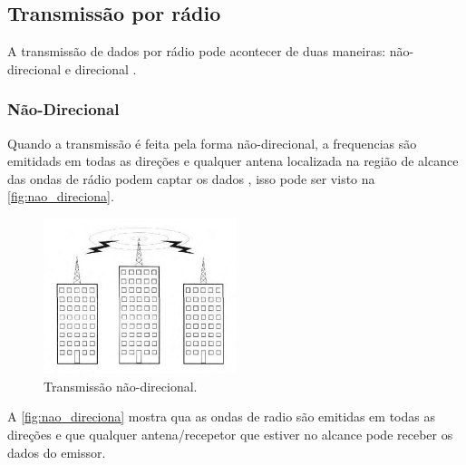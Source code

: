     \subsection{Transmissão por  rádio}
        \par
        A transmissão de dados por rádio pode acontecer de duas maneiras: não-direcional e direcional  \cite{torres2001}.
        
        \subsubsection{Não-Direcional}
        \par
        Quando a transmissão é feita pela forma não-direcional, a frequencias são emitidads em todas as direções e qualquer antena localizada na região de alcance das ondas de rádio podem captar os dados \citeauthor{torres2001}, isso pode ser visto na \autoref{fig:nao_direciona}.

            \begin{figure}[h!]
              \caption{\label{fig:nao_direciona}{Transmissão não-direcional.}}
              \centering
              \includegraphics[width=0.5\textwidth]{Figuras/transmissao_radio_nao_direcional.PNG}
            \end{figure}
        \par
        A  \autoref{fig:nao_direciona} mostra qua as ondas de radio são emitidas em todas as direções e que qualquer antena/recepetor que estiver no alcance pode receber os dados do emissor.

